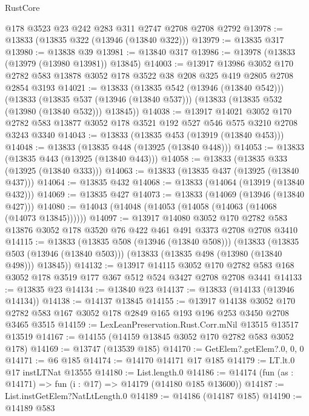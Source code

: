 \begin{lexlean}{RustCore}
\begin{coremodule}
    @178
    @3523
    @23
    @242
    @283
    @311
    @2747
    @2708
    @2708
    @2792
@13978 := @13833 (@13835 @322 (@13946 (@13840 @322)))
@13979 := @13835 @317
@13980 := @13838 @39
@13981 := @13840 @317
@13986 := @13978 (@13833 (@13979 (@13980 @13981)) @13845)
@14003 := @13917
    @13986
    @3052
    @170
    @2782
    @583
    @13878
    @3052
    @178
    @3522
    @38
    @208
    @325
    @419
    @2805
    @2708
    @2854
    @3193
@14021 := @13833
    (@13835 @542 (@13946 (@13840 @542)))
    (@13833
      (@13835 @537 (@13946 (@13840 @537)))
      (@13833 (@13835 @532 (@13980 (@13840 @532))) @13845))
@14038 := @13917
    @14021
    @3052
    @170
    @2782
    @583
    @13877
    @3052
    @178
    @3521
    @192
    @527
    @546
    @575
    @3210
    @2708
    @3243
    @3340
@14043 := @13833 (@13835 @453 (@13919 (@13840 @453)))
@14048 := @13833 (@13835 @448 (@13925 (@13840 @448)))
@14053 := @13833 (@13835 @443 (@13925 (@13840 @443)))
@14058 := @13833 (@13835 @333 (@13925 (@13840 @333)))
@14063 := @13833 (@13835 @437 (@13925 (@13840 @437)))
@14064 := @13835 @432
@14068 := @13833 (@14064 (@13919 (@13840 @432)))
@14069 := @13835 @427
@14073 := @13833 (@14069 (@13946 (@13840 @427)))
@14080 := @14043 (@14048 (@14053 (@14058 (@14063 (@14068 (@14073 @13845))))))
@14097 := @13917
    @14080
    @3052
    @170
    @2782
    @583
    @13876
    @3052
    @178
    @3520
    @76
    @422
    @461
    @491
    @3373
    @2708
    @2708
    @3410
@14115 := @13833
    (@13835 @508 (@13946 (@13840 @508)))
    (@13833
      (@13835 @503 (@13946 (@13840 @503)))
      (@13833 (@13835 @498 (@13980 (@13840 @498))) @13845))
@14132 := @13917
    @14115
    @3052
    @170
    @2782
    @583
    @168
    @3052
    @178
    @3519
    @177
    @367
    @512
    @524
    @3427
    @2708
    @2708
    @3441
@14133 := @13835 @23
@14134 := @13840 @23
@14137 := @13833 (@14133 (@13946 @14134))
@14138 := @14137 @13845
@14155 := @13917
    @14138
    @3052
    @170
    @2782
    @583
    @167
    @3052
    @178
    @2849
    @165
    @193
    @196
    @253
    @3450
    @2708
    @3465
    @3515
@14159 := LexLeanPreservation.Rust.Corr.mNil @13515 @13517 @13519
@14167 := @14155 (@14159 @13845 @3052 @170 @2782 @583 @3052 @178)
@14169 := @13747 (@13539 @185)
@14170 := GetElem?.getElem?.{0, 0, 0}
@14171 := @6 @185
@14174 := @14170 @14171 @17 @185
@14179 := LT.lt.{0} @17 instLTNat @13555
@14180 := List.length.{0}
@14186 := @14174 (fun (as : @14171) => fun (i : @17) => @14179 (@14180 @185 @13600))
@14187 := List.instGetElem?NatLtLength.{0}
@14189 := @14186 (@14187 @185)
@14190 := @14189 @583

\end{coremodule}
\end{lexlean}
